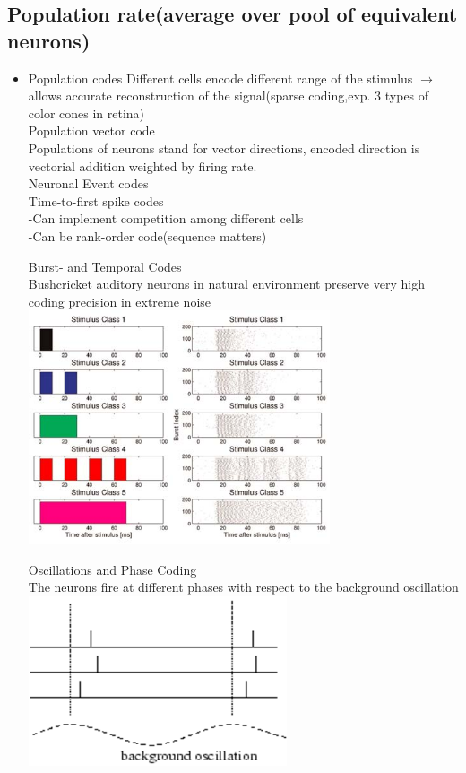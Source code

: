 \documentclass[english,11pt]{article}
\begin{document}
\subsection{Population rate(average over pool of equivalent neurons)}
\begin{itemize}
\item Population codes
\subitem Different cells encode different range of the stimulus $\rightarrow$ allows accurate reconstruction of the signal(sparse coding,exp. 3 types of color cones in retina)\\

\subitem Population vector code\\
Populations of neurons stand for vector directions, encoded direction is vectorial addition weighted by firing rate.\\

\subitem Neuronal Event codes\\
Time-to-first spike codes\\
-Can implement competition among different cells\\
-Can be rank-order code(sequence matters)

\subitem Burst- and Temporal Codes\\
Bushcricket auditory neurons in natural environment preserve very high coding precision in extreme noise\\
\includegraphics[width=0.7\textwidth]{burst-code.png}

\subitem Oscillations and Phase Coding\\
The neurons fire at different phases with respect to the background oscillation\\
\includegraphics[width=0.6\textwidth]{phase-code.png}


\end{itemize}
\end{document}

